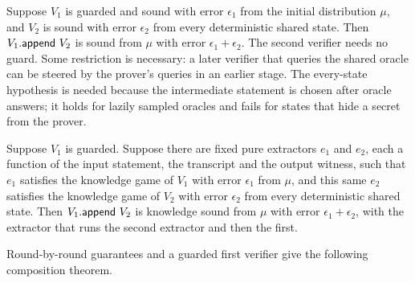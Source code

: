 \begin{theorem}
    \label{thm:soundness_append}
    Suppose $V_1$ is guarded and sound with error $\epsilon_1$ from the initial distribution $\mu$,
    and $V_2$ is sound with error $\epsilon_2$ from every deterministic shared state. Then
    $V_1.\mathsf{append}\ V_2$ is sound from $\mu$ with error $\epsilon_1 + \epsilon_2$. The second verifier
    needs no guard. Some restriction is necessary: a later verifier that queries the shared oracle
    can be steered by the prover's queries in an earlier stage. The every-state hypothesis is needed
    because the intermediate statement is chosen after oracle answers; it holds for lazily sampled
    oracles and fails for states that hide a secret from the prover.
    \leanok
\end{theorem}

\begin{theorem}
    \label{thm:knowledge_soundness_append}
    Suppose $V_1$ is guarded. Suppose there are fixed pure extractors $e_1$ and $e_2$, each a
    function of the input statement, the transcript and the output witness, such that $e_1$
    satisfies the knowledge game of $V_1$ with error $\epsilon_1$ from $\mu$, and this same $e_2$
    satisfies the knowledge game of $V_2$ with error $\epsilon_2$ from every deterministic shared
    state. Then $V_1.\mathsf{append}\ V_2$ is
    knowledge sound from $\mu$ with error $\epsilon_1 + \epsilon_2$, with the extractor that runs the
    second extractor and then the first.
    \leanok
\end{theorem}

Round-by-round guarantees and a guarded first verifier give the following composition theorem.

